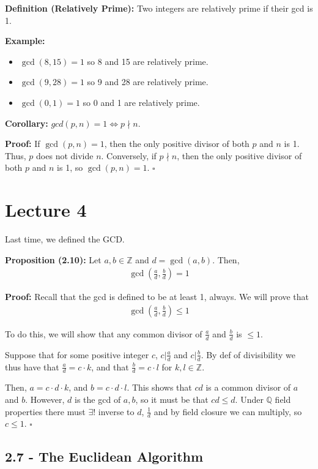 \documentclass{article}
\newcommand*{\qed}{\hfill$\square$}%
\newcommand*{\zz}{\mathbb{Z}}%
\begin{document}
\textbf{Definition (Relatively Prime):} Two integers are relatively prime if their gcd is 1.

\textbf{Example:} \begin{itemize}
    \item $\gcd(8,15)=1$ so 8 and 15 are relatively prime.
    \item $\gcd(9,28)=1$ so 9 and 28 are relatively prime.
    \item $\gcd(0,1)=1$ so 0 and 1 are relatively prime.
\end{itemize}

\textbf{Corollary:} $gcd(p,n)=1\iff p \nmid n$.

\textbf{Proof:} If $\gcd(p,n)=1$, then the only positive divisor of both $p$ and $n$ is 1. Thus, $p$ does not divide $n$. Conversely, if $p \nmid n$, then the only positive divisor of both $p$ and $n$ is 1, so $\gcd(p,n)=1$. \qed

\section{Lecture 4}

Last time, we defined the GCD. 

\textbf{Proposition (2.10):} Let $a,b\in \zz$ and $d=\gcd(a,b)$. Then, \begin{align*}
    \gcd(\frac{a}{d},\frac{b}{d})=1
\end{align*}

\textbf{Proof:} Recall that the gcd is defined to be at least 1, always. We will prove that \begin{align*}
    \gcd(\frac{a}{d},\frac{b}{d})\leq 1
\end{align*}

To do this, we will show that any common divisor of $\frac{a}{d}$ and $\frac{b}{d}$ is $\leq 1$. 

Suppose that for some positive integer $c$, $c|\frac{a}{d}$ and $c|\frac{b}{d}$. By def of divisibility we thus have that $\frac{a}{d}=c\cdot k$, and that $\frac{b}{d}=c\cdot l$ for $k,l\in \zz$.

Then, $a=c\cdot d \cdot k$, and $b=c\cdot d\cdot l$. This shows that $cd$ is a common divisor of $a$ and $b$. However, $d$ is the gcd of $a,b$, so it must be that $cd\leq d$. Under $\mathbb{Q}$ field properties there must $\exists!$ inverse to $d$, $\frac{1}{d}$ and by field closure we can multiply, so $c\leq 1$. \qed 

\subsection{2.7 - The Euclidean Algorithm}
\end{document}
